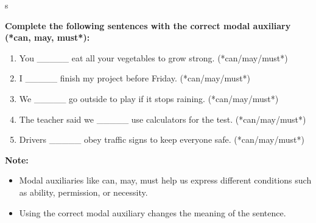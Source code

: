 s\documentclass[12pt]{article}
\begin{document}
\vspace{1em}

\begin{tcolorbox}[colframe=black!60, colback=white, 
coltitle=black, colbacktitle=black!15, fonttitle=\bfseries\Large, 
title=Guided Practice, halign title=center, left=10pt, right=10pt, top=10pt, bottom=15pt]
\textbf{Complete the following sentences with the correct modal auxiliary (*can, may, must*):}
\begin{enumerate}[itemsep=3em]
    \item You \_\_\_\_\_ eat all your vegetables to grow strong. (*can/may/must*)
    \item I \_\_\_\_\_ finish my project before Friday. (*can/may/must*)
    \item We \_\_\_\_\_ go outside to play if it stops raining. (*can/may/must*)
    \item The teacher said we \_\_\_\_\_ use calculators for the test. (*can/may/must*)
    \item Drivers \_\_\_\_\_ obey traffic signs to keep everyone safe. (*can/may/must*)
\end{enumerate}
\end{tcolorbox}

\vspace{1em}

\begin{tcolorbox}[colframe=black!40, colback=gray!5, 
coltitle=black, colbacktitle=black!20, fonttitle=\bfseries\Large, 
title=Additional Notes, halign title=center, left=5pt, right=5pt, top=5pt, bottom=15pt]
\textbf{Note:}
\begin{itemize}
    \item Modal auxiliaries like can, may, must help us express different conditions such as ability, permission, or necessity.
    \item Using the correct modal auxiliary changes the meaning of the sentence.
\end{itemize}
\end{tcolorbox}

\vspace{1em}
\end{document}
